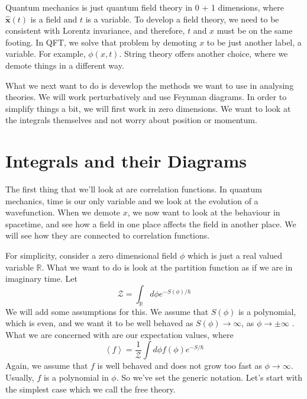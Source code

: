 \documentclass[11pt, oneside]{article}   	%
\theoremstyle{slanted}
\renewcommand{\op}[1]{\hat{\mathbf{#1}}}
\begin{document}
Quantum mechanics is just quantum field theory in 
0 + 1 dimensions, where $ \op{x } \left( t  \right)  $ is 
a field and $ t $ is a variable. 
To develop a field theory, we 
need to be consistent with Lorentz invariance,
and therefore, $ t $ and $ x $  must 
be on the same footing. 
In QFT, we solve that problem by demoting 
$ x $ to be just another label, a variable. 
For example, $ \phi \left( x, t  \right)  $. 
String theory offers another choice, where 
we demote things in a different way. 

What we next want to do is devewlop the 
methods we want to use in analysing theories. 
We will work perturbatively and use 
Feynman diagrams. 
In order to simplify things a bit, 
we will first work in zero dimensions. 
We want to look at the integrals themselves and not 
worry about position or momentum. 

\section{Integrals and their Diagrams}
The first thing that we'll look at 
are correlation functions. 
In quantum mechanics, time is our only variable 
and we look at the evolution of a wavefunction. 
When we demote $ x   $, we 
now want to look at the behaviour 
in spacetime, and see how a field in one place 
affects the field in another place. 
We will see how they are connected to correlation functions. 

For simplicity, 
consider a zero dimensional 
field 
$ \phi $ which is just a real valued 
variable $ \mathbb{ R } $. 
What we want to do is look at the partition function 
as if we are in imaginary time. 
Let 
\[
\mathcal{ Z }  = \int _{ \mathbb{ R }} d \phi  e^{  - S ( \phi  ) / \hbar} 
\] We will add some assumptions for this. 
We assume that $ S \left( \phi  \right)  $ is a polynomial, 
which is even, and we want it 
to be well behaved as $ S ( \phi ) \to \infty $, 
as $ \phi \to \pm \infty  $ . 
What we are concerned with are our expectation values, 
where 
\[
\left< f  \right>  = \frac{1}{\mathcal{ Z }  } 
\int d \phi f ( \phi ) e ^{  - S / \hbar }
\] Again, we assume that 
$ f $ is well behaved and does not 
grow too fast as $ \phi \to \infty $. 
Usually, $ f $ is a polynomial in $ \phi $. 
So we've set the generic notation. 
Let's start with the simplest case which we 
call the free theory. 
\end{document}

